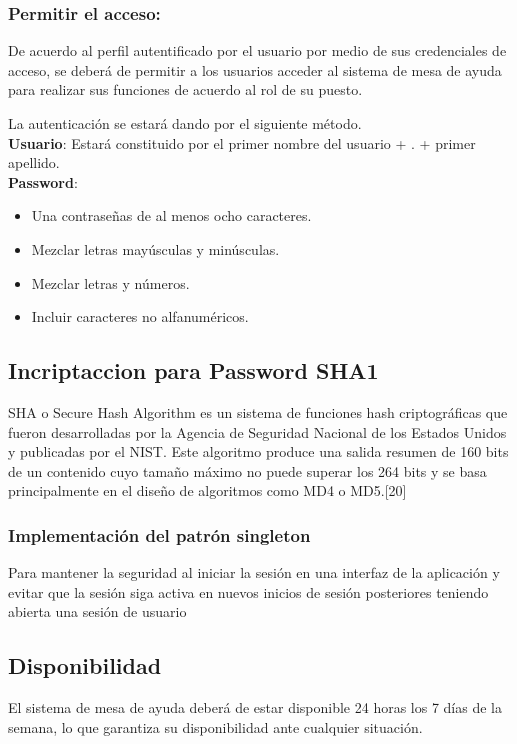 \subsubsection{ Permitir el acceso:}
De acuerdo al perfil autentificado por el 
usuario por medio de sus credenciales de acceso, se deberá de 
permitir a los usuarios  acceder al sistema de mesa de ayuda para 
realizar sus funciones de acuerdo al rol de su puesto.

La autenticación se estará dando por el siguiente método.\\


\textbf{Usuario}: Estará constituido por el primer nombre del usuario + . + primer apellido.\\
\textbf{Password}: 
\begin{itemize}
	\item Una contraseñas de al menos ocho caracteres.
	\item Mezclar letras mayúsculas y minúsculas.
	\item Mezclar letras y números.
	\item Incluir caracteres no alfanuméricos.
\end{itemize}

\subsection{Incriptaccion para Password SHA1}
SHA o Secure Hash Algorithm es un sistema de funciones hash criptográficas que fueron desarrolladas por la Agencia de Seguridad Nacional de los Estados Unidos y publicadas por el NIST. Este algoritmo produce una salida resumen de 160 bits de un contenido cuyo tamaño máximo no puede superar los 264 bits y se basa principalmente en el diseño de algoritmos como MD4 o MD5.[20]

\subsubsection{Implementación del patrón singleton}

Para 
mantener la seguridad al iniciar la sesión en una interfaz de la 
aplicación y evitar que la sesión siga activa en nuevos inicios de 
sesión posteriores teniendo abierta una sesión de usuario

\subsection{Disponibilidad}

El sistema de mesa de ayuda deberá de estar 
disponible 24 horas los 7 días de la semana, lo que garantiza su 
disponibilidad ante cualquier situación.


